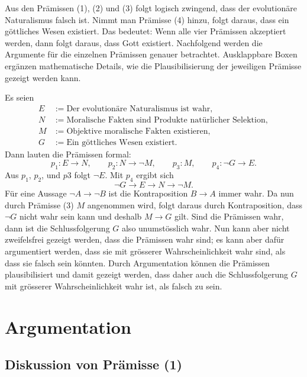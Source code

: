 \documentclass[11pt,a4paper]{article}
\begin{document}
	Aus den Prämissen (1), (2) und (3) folgt logisch zwingend, dass der evolutionäre Naturalismus falsch ist. Nimmt man Prämisse (4) hinzu, folgt daraus, dass ein göttliches Wesen existiert. Das bedeutet: Wenn alle vier Prämissen akzeptiert werden, dann folgt daraus, dass Gott existiert. Nachfolgend werden die Argumente für die einzelnen Prämissen genauer betrachtet. Ausklappbare Boxen ergänzen mathematische Details, wie die Plausibilisierung der jeweiligen Prämisse gezeigt werden kann.
	
	\begin{tcolorbox}[title=Mathematik-Box: Die logische Struktur des Arguments]
		Es seien
		\[
		\begin{aligned}
			E &:= \text{Der evolutionäre Naturalismus ist wahr},\\
			N &:= \text{Moralische Fakten sind Produkte natürlicher Selektion},\\
			M &:= \text{Objektive moralische Fakten existieren},\\
			G &:= \text{Ein göttliches Wesen existiert}.
		\end{aligned}
		\]
		Dann lauten die Prämissen formal:
		\[
		p_1:E\rightarrow N,\qquad
		p_2:N\rightarrow\neg M,\qquad
		p_3:M,\qquad
		p_4:\neg G\rightarrow E.
		\]
		Aus $p_1$, $p_2$, und $p3$ folgt  \(\neg E\). Mit \(p_4\) ergibt sich
		\[
		\neg G\rightarrow E\rightarrow N\rightarrow\neg M.
		\]
		Für eine Aussage $\neg A \rightarrow \neg B$ ist die Kontraposition $B \rightarrow A$ immer wahr. Da nun durch Prämisse (3) \(M\) angenommen wird, folgt daraus durch Kontraposition, dass \(\neg G\) nicht wahr sein kann und deshalb
		\( M \rightarrow G\) gilt. Sind die Prämissen wahr, dann ist die Schlussfolgerung $G$ also unumstösslich wahr. Nun kann aber nicht zweifelsfrei gezeigt werden, dass die Prämissen wahr sind; es kann aber dafür argumentiert werden, dass sie mit grösserer Wahrscheinlichkeit wahr sind, als dass sie falsch sein könnten. Durch Argumentation können die Prämissen plausibilisiert und damit gezeigt werden, dass daher auch die Schlussfolgerung $G$ mit grösserer Wahrscheinlichkeit wahr ist, als falsch zu sein.
	\end{tcolorbox}
	
	\section{Argumentation}
	\subsection{Diskussion von Prämisse (1)}
	
\end{document}

